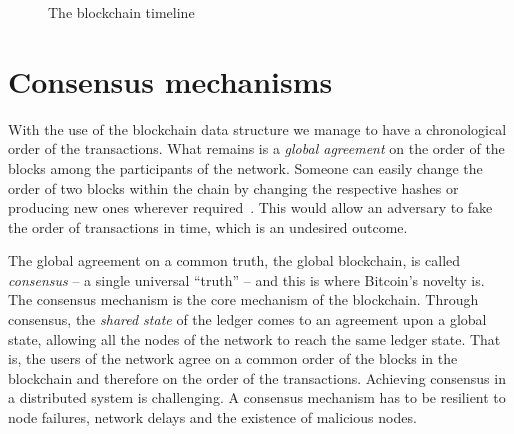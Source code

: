 \begin{figure}[ht!]
  \caption{The blockchain timeline}
  \label{fig:blockchain_timeline}
\end{figure}

\section{Consensus mechanisms}\label{blockchain:consensus_mechanisms}

With the use of the blockchain data structure we manage to have a  chronological order of the transactions. What remains is a \textit{global agreement} on the order of the blocks among the participants of the network. Someone can easily change the order of two blocks within the chain by changing the respective hashes or producing new ones wherever required~\cite{zindros_thesis}. This would allow an adversary to fake the order of transactions in time, which is an undesired outcome.

The global agreement on a common truth, the global blockchain, is called \textit{consensus} -- a single universal “truth” -- and this is where Bitcoin's novelty is. The consensus mechanism is the core mechanism of the blockchain. Through consensus, the \textit{shared state} of the ledger comes to an agreement upon a global state, allowing all the nodes of the network to reach the same ledger state. That is, the users of the network agree on a common order of the blocks in the blockchain and therefore on the order of the transactions. Achieving consensus in a distributed system is challenging. A consensus mechanism has to be resilient to node failures, network delays and the existence of malicious nodes.


